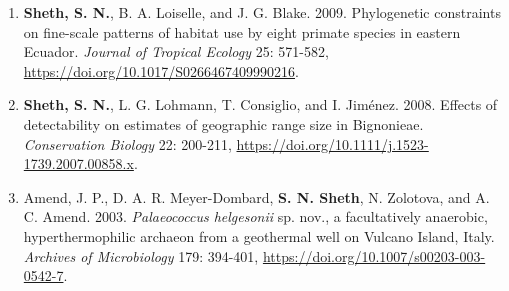 \documentclass[11pt,english]{article}\usepackage[]{graphicx}\usepackage[]{xcolor}
\providecommand{\tabularnewline}{\\}
\begin{document}
\begin{hangparas}{.5in}{1}
\begin{enumerate}
\item \textbf{Sheth, S. N.}, B. A. Loiselle, and J. G. Blake. 2009. Phylogenetic constraints on fine-scale patterns of habitat use by eight primate species in eastern Ecuador. \emph{Journal of Tropical Ecology} 25: 571-582, \url{https://doi.org/10.1017/S0266467409990216}. 

\item \textbf{Sheth, S. N.}, L. G. Lohmann, T. Consiglio, and I. Jim\'enez. 2008. Effects of detectability on estimates of geographic range size in Bignonieae. \emph{Conservation Biology} 22: 200-211, \url{https://doi.org/10.1111/j.1523-1739.2007.00858.x}. 

\item Amend, J. P., D. A. R. Meyer-Dombard, \textbf{S. N. Sheth}, N. Zolotova, and A. C. Amend. 2003. \textit{Palaeococcus helgesonii} sp. nov., a facultatively anaerobic, hyperthermophilic archaeon from a geothermal well on Vulcano Island, Italy. \emph{Archives of Microbiology} 179: 394-401, \url{https://doi.org/10.1007/s00203-003-0542-7}. 

\end{enumerate}
\end{hangparas}






\end{document}
